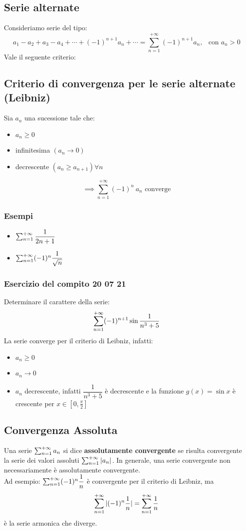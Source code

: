 \documentclass[../main.tex]{subfiles}
\begin{document}
\subsection{Serie alternate}
Consideriamo serie del tipo:
\[
    a_1 - a_2 + a_3 - a_4 + \cdots + (-1)^{n+1}a_n + \cdots = \sum_{n=1}^{+\infty}(-1)^{n+1}a_n, \ \ \text{ con } a_n > 0
\]
Vale il seguente criterio:
\subsection{Criterio di convergenza per le serie alternate (Leibniz)}
Sia $a_n$ una sucessione tale che:
\begin{itemize}
    \item $a_n \geq 0$
    \item infinitesima $(a_n \to 0)$
    \item decrescente $(a_{n} \geq a_{n+1}) \forall n$
\end{itemize}
\[
    \implies \sum_{n = 1}^{+\infty} (-1)^{n}\ a_n \text{ converge}
\]

\subsubsection{Esempi}
\begin{itemize}
    \item $\sum_{n=1}^{+\infty} \dfrac{1}{2n+1}$
    \item $\sum_{n=1}^{+\infty} (-1)^n \dfrac{1}{\sqrt{n}}$
\end{itemize}

\subsubsection{Esercizio del compito 20 07 21}
Determinare il carattere della serie:
\[
    \sum_{n=1}^{+\infty} (-1)^{n+1}\sin\dfrac{1}{n^3+5}
\]
La serie converge per il criterio di Leibniz, infatti:
\begin{itemize}
    \item $a_n \geq 0$
    \item $a_n \to 0$
    \item $a_n$ decrescente, infatti $\dfrac{1}{n^3+5}$ è decrescente e la funzione $g(x) = \sin x$ è crescente per $x \in [0,\frac{\pi}{2}]$
\end{itemize}

\subsection{Convergenza Assoluta}
Una serie $\sum_{n=1}^{+\infty} a_n$ si dice \textbf{assolutamente convergente} se risulta
convergente la serie dei valori assoluti $\sum_{n=1}^{+\infty} |a_n|$. In generale, una serie
convergente non necessariamente è assolutamente convergente. \\ Ad esempio:
$\sum_{n=1}^{+\infty} (-1)^n \dfrac{1}{n}$ è convergente per il criterio di Leibniz, ma
\[
    \sum_{n=1}^{+\infty} |(-1)^n\dfrac{1}{n}| = \sum_{n=1}^{+\infty} \dfrac{1}{n}
\]
è la serie armonica che diverge.
\end{document}
